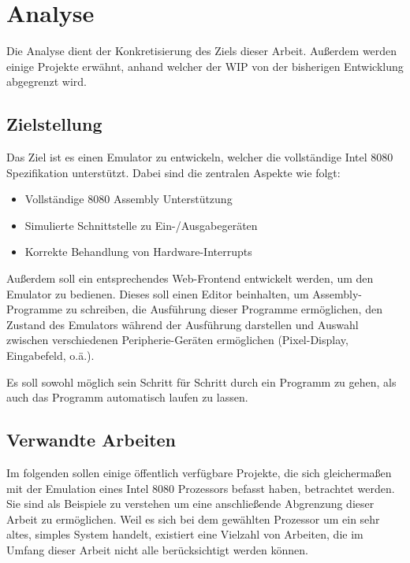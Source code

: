 \chapter{Analyse}

Die Analyse dient der Konkretisierung des Ziels dieser Arbeit. Außerdem werden einige Projekte erwähnt, anhand welcher der \ac{WIP} von der bisherigen Entwicklung abgegrenzt wird.

\section{Zielstellung}\label{goals}

Das Ziel ist es einen Emulator zu entwickeln, welcher die vollständige Intel 8080 Spezifikation\cite{datasheet} unterstützt. Dabei sind die zentralen Aspekte wie folgt:

\begin{itemize}
    \item Vollständige 8080 Assembly Unterstützung
    \item Simulierte Schnittstelle zu Ein-/Ausgabegeräten
    \item Korrekte Behandlung von Hardware-Interrupts
\end{itemize}

Außerdem soll ein entsprechendes Web-Frontend entwickelt werden, um den Emulator zu bedienen.
Dieses soll einen Editor beinhalten, um Assembly-Programme zu schreiben, die Ausführung dieser Programme ermöglichen, den Zustand des Emulators während der Ausführung darstellen und Auswahl zwischen verschiedenen Peripherie-Geräten ermöglichen (Pixel-Display, Eingabefeld, o.ä.). 

Es soll sowohl möglich sein Schritt für Schritt durch ein Programm zu gehen, als auch das Programm automatisch laufen zu lassen.

\section{Verwandte Arbeiten}\label{chap:similar-work}

Im folgenden sollen einige öffentlich verfügbare Projekte, die sich gleichermaßen mit der Emulation eines Intel 8080 Prozessors befasst haben, betrachtet werden. Sie sind als Beispiele zu verstehen um eine anschließende Abgrenzung dieser Arbeit zu ermöglichen. Weil es sich bei dem gewählten Prozessor um ein sehr altes, simples System handelt, existiert eine Vielzahl von Arbeiten, die im Umfang dieser Arbeit nicht alle berücksichtigt werden können.

